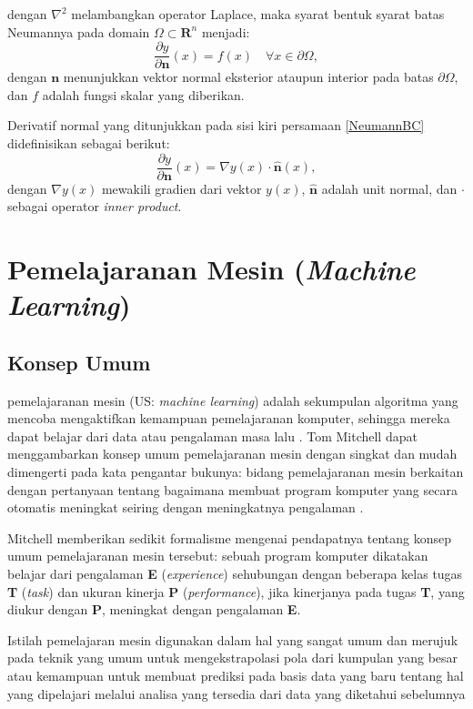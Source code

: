 dengan $\nabla^2$ melambangkan operator Laplace, maka syarat bentuk syarat batas Neumannya pada domain $\Omega \subset \mathbf{R}^n$ menjadi:
\begin{equation}\label{NeumannBC}
    \frac{\partial y}{\partial \textbf{n}}(x) = f(x)\quad \forall x \in \partial \Omega,
\end{equation}
dengan $\mathbf{n}$ menunjukkan vektor normal eksterior ataupun interior pada batas $\partial\Omega$, dan $f$ adalah fungsi skalar yang diberikan.

Derivatif normal yang ditunjukkan pada sisi kiri persamaan \eqref{NeumannBC} didefinisikan sebagai berikut:
\begin{equation}
    \frac{\partial y}{\partial\mathbf{n}}(x) = \nabla y (x) \cdot \hat{\mathbf{n}}(x),
\end{equation}
dengan $\nabla y (x)$ mewakili gradien dari vektor $y(x)$, $\hat{\mathbf{n}}$ adalah unit normal, dan $\cdot$ sebagai operator \emph{inner product}.

\section{Pemelajaranan Mesin (\emph{Machine Learning})}
\subsection{Konsep Umum}
pemelajaranan mesin (US: \emph{machine learning}) adalah sekumpulan algoritma yang mencoba mengaktifkan kemampuan pemelajaranan komputer, sehingga mereka dapat belajar dari data atau pengalaman masa lalu \citep{bayen_2020_python}.
Tom Mitchell dapat menggambarkan konsep umum pemelajaranan mesin dengan singkat dan mudah dimengerti pada kata pengantar bukunya: bidang pemelajaranan mesin berkaitan dengan pertanyaan tentang bagaimana membuat program komputer yang secara otomatis meningkat seiring dengan meningkatnya pengalaman \citep{Mitchell1997}.

Mitchell memberikan sedikit formalisme mengenai pendapatnya tentang konsep umum pemelajaranan mesin tersebut: sebuah program komputer dikatakan belajar dari pengalaman \textbf{E} (\emph{experience}) sehubungan dengan beberapa kelas tugas \textbf{T} (\emph{task}) dan ukuran kinerja \textbf{P} (\emph{performance}), jika kinerjanya pada tugas \textbf{T}, yang diukur dengan \textbf{P}, meningkat dengan pengalaman \textbf{E}.

Istilah pemelajaran mesin digunakan dalam hal yang sangat umum dan merujuk pada teknik yang umum untuk mengekstrapolasi pola dari kumpulan yang besar atau kemampuan untuk membuat prediksi pada basis data yang baru tentang hal yang dipelajari melalui analisa yang tersedia dari data yang diketahui sebelumnya \citep{zocca_spacagna_slater_roelants_2017}

